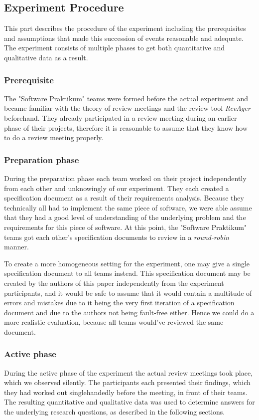 \subsection{Experiment Procedure}
This part describes the procedure of the experiment including the prerequisites and assumptions that made this succession of events  reasonable and adequate.
The experiment consists of multiple phases to get both quantitative and qualitative data as a result.
\subsubsection{Prerequisite}
The "Software Praktikum" teams were formed before the actual experiment and became familiar with the theory of review meetings and the review tool \textit{RevAger} beforehand.
They already participated in a review meeting during an earlier phase of their projects, therefore it is reasonable to assume that they know how to do a review meeting properly.
\subsubsection{Preparation phase}
During the preparation phase each team worked on their project independently from each other and unknowingly of our experiment.
They each created a specification document as a result of their requirements analysis.
Because they technically all had to implement the same piece of software, we were able assume that they had a good level of understanding of the underlying problem and the requirements for this piece of software.
At this point, the "Software Praktikum" teams got each other's specification documents to review in a \textit{round-robin} manner.

To create a more homogeneous setting for the experiment, one may give a single specification document to all teams instead.
This specification document may be created by the authors of this paper independently from the experiment participants, and it would be safe to assume that it would contain a multitude of errors and mistakes due to it being the very first iteration of a specification document and due to the authors not being fault-free either.
Hence we could do a more realistic evaluation, because all teams would've reviewed the same document.
\subsubsection{Active phase}
During the active phase of the experiment the actual review meetings took place, which we observed silently.
The participants each presented their findings, which they had worked out singlehandedly before the meeting, in front of their teams.
The resulting quantitative and qualitative data was used to determine answers for the underlying research questions, as described in the following sections.

